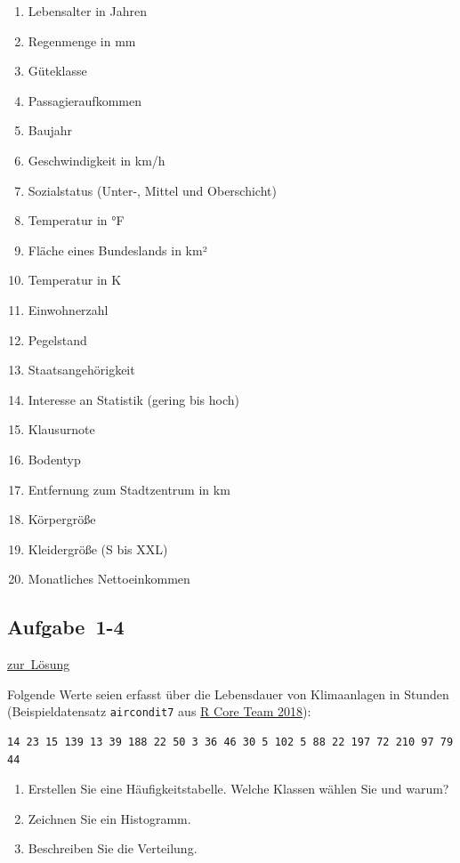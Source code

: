 \documentclass[
  11pt,
  ngerman,
  a4paper,
]{report}
\providecommand{\tightlist}{%
  \setlength{\itemsep}{0pt}\setlength{\parskip}{0pt}}
\begin{document}
\begin{enumerate}
\def\labelenumi{\alph{enumi})}
\tightlist
\item
  Lebensalter in Jahren
\item
  Regenmenge in mm
\item
  Güteklasse
\item
  Passagieraufkommen
\item
  Baujahr
\item
  Geschwindigkeit in km/h
\item
  Sozialstatus (Unter-, Mittel und Oberschicht)
\item
  Temperatur in °F
\item
  Fläche eines Bundeslands in km²
\item
  Temperatur in K
\item
  Einwohnerzahl
\item
  Pegelstand
\item
  Staatsangehörigkeit
\item
  Interesse an Statistik (gering bis hoch)
\item
  Klausurnote
\item
  Bodentyp
\item
  Entfernung zum Stadtzentrum in km
\item
  Körpergröße
\item
  Kleidergröße (S bis XXL)
\item
  Monatliches Nettoeinkommen
\end{enumerate}

\hypertarget{aufgabe-1-4}{%
\subsection{Aufgabe~1-4}\label{aufgabe-1-4}}

\protect\hyperlink{loesung-1-4}{zur~Lösung}

Folgende Werte seien erfasst über die Lebensdauer von Klimaanlagen in Stunden (Beispieldatensatz \texttt{aircondit7} aus \protect\hyperlink{ref-r}{R Core Team 2018}):

\begin{verbatim}
14 23 15 139 13 39 188 22 50 3 36 46 30 5 102 5 88 22 197 72 210 97 79 44
\end{verbatim}

\begin{enumerate}
\def\labelenumi{\alph{enumi})}
\tightlist
\item
  Erstellen Sie eine Häufigkeitstabelle. Welche Klassen wählen Sie und warum?
\item
  Zeichnen Sie ein Histogramm.
\item
  Beschreiben Sie die Verteilung.
\end{enumerate}
\end{document}
